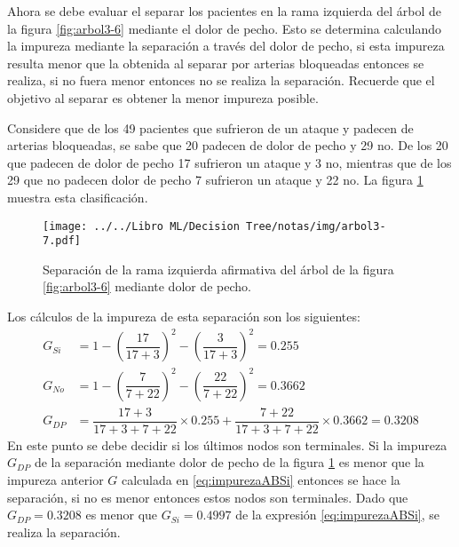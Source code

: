 \documentclass[
10pt, %
a4paper, %
]{article}
\begin{document}
Ahora se debe evaluar el separar los pacientes en la rama izquierda del árbol de la figura \ref{fig:arbol3-6} mediante el dolor de pecho. Esto se determina calculando la 
impureza mediante la separación a través del dolor de pecho, si esta impureza resulta menor que la obtenida al separar por arterias bloqueadas entonces se realiza, 
si no fuera menor entonces no se realiza la separación. Recuerde que el objetivo al separar es obtener la menor impureza posible.

Considere que de los 49 pacientes que sufrieron de un ataque y padecen de arterias bloqueadas, se sabe que 20 padecen de dolor de pecho y 29 no. De los 20 que padecen de 
dolor de pecho 17 sufrieron un ataque y 3 no, mientras que de los 29 que no padecen dolor de pecho 7 sufrieron un ataque y 22 no. La figura \ref{fig:arbol3-7} muestra 
esta clasificación.
\begin{figure}[H]
	\centering
	\texttt{[image: ../../Libro ML/Decision Tree/notas/img/arbol3-7.pdf]}
	\caption{Separación de la rama izquierda afirmativa del árbol de la figura \ref{fig:arbol3-6} mediante dolor de pecho.}
	\label{fig:arbol3-7}
\end{figure}
Los cálculos de la impureza de esta separación son los siguientes:
\begin{align*}
	G_{Si} &= 1 - \left(\dfrac{17}{17+3}\right)^2 - \left(\dfrac{3}{17+3}\right)^2 = 0.255\\
	G_{No} &= 1 - \left(\dfrac{7}{7+22}\right)^2 - \left(\dfrac{22}{7+22}\right)^2 = 0.3662\\
	G_{DP} &= \dfrac{17+3}{17+3+7+22}\times 0.255 + \dfrac{7+22}{17+3+7+22}\times 0.3662 = 0.3208
\end{align*}
En este punto se debe decidir si los últimos nodos son terminales. Si la impureza $G_{DP}$ de la separación mediante dolor de pecho de la figura \ref{fig:arbol3-7} es menor 
que la impureza anterior $G$ calculada en \ref{eq:impurezaABSi} entonces se hace la separación, si no es menor entonces estos nodos son terminales. Dado que $G_{DP}=0.3208$ 
es menor que $G_{Si}=0.4997$ de la expresión \ref{eq:impurezaABSi}, se realiza la separación.
\end{document}
